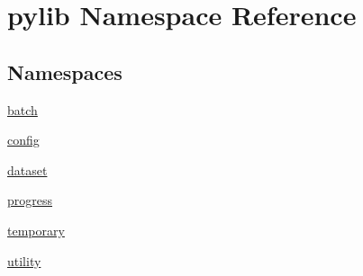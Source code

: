 \hypertarget{namespacepylib}{}\section{pylib Namespace Reference}
\label{namespacepylib}
\subsection*{Namespaces}
\begin{DoxyCompactItemize}
\item 
 \hyperlink{namespacepylib_1_1batch}{batch}
\item 
 \hyperlink{namespacepylib_1_1config}{config}
\item 
 \hyperlink{namespacepylib_1_1dataset}{dataset}
\item 
 \hyperlink{namespacepylib_1_1progress}{progress}
\item 
 \hyperlink{namespacepylib_1_1temporary}{temporary}
\item 
 \hyperlink{namespacepylib_1_1utility}{utility}
\end{DoxyCompactItemize}
